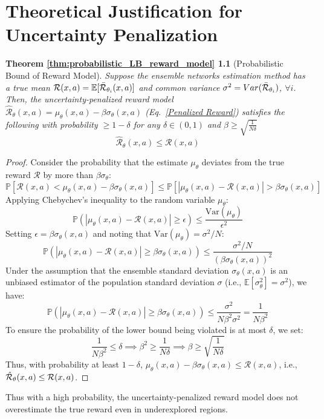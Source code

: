 \documentclass[./dissertation.tex]{subfiles}
\begin{document}
\chapter{Theoretical Justification for Uncertainty Penalization}
\label{sec:ensemble_theory}
\newtheorem*{repeatedThm}{Theorem \ref{thm:probabilistic_LB_reward_model}}
\begin{repeatedThm}[Probabilistic Bound of Reward Model]
Suppose the ensemble networks estimation method has a true mean ${\cal R}(x,a)=\mathbb{E}[\bar{\cal R}_{\theta_i}(x,a)]$ and common variance $\sigma^2=Var(\bar{\cal R}_{\theta_i})$, $\forall i$. Then, the uncertainty-penalized reward model $\hat{\mathcal{R}}_\theta(x, a) = \mu_\theta(x, a) - \beta \sigma_\theta(x, a)$ (Eq.~\ref{Penalized Reward}) satisfies the following with probability $\ge 1 - \delta$ for any $\delta \in (0, 1)$ and $\beta \geq \sqrt{\frac{1}{N\delta}}$
\[ \hat{\mathcal{R}}_\theta(x, a) \leq \mathcal{R}(x, a) \]
\end{repeatedThm}

\begin{proof}
Consider the probability that the estimate $\mu_\theta$ deviates from the true reward $\mathcal{R}$ by more than $\beta \sigma_\theta$:
\[ \mathbb{P}\left[ \mathcal{R}(x, a) < \mu_\theta(x, a) - \beta \sigma_\theta(x, a) \right] \leq \mathbb{P}\left[ |\mu_\theta(x, a) - \mathcal{R}(x, a)| > \beta \sigma_\theta(x, a) \right] \]
Applying Chebychev's inequality to the random variable $\mu_\theta$:
\[ \mathbb{P}\left( |\mu_\theta(x, a) - \mathcal{R}(x, a)| \geq \epsilon \right) \leq \frac{\text{Var}(\mu_\theta)}{\epsilon^2} \]
Setting $\epsilon = \beta \sigma_\theta(x, a)$ and noting that $\text{Var}(\mu_\theta)=\sigma^2/N$:
\[ \mathbb{P}\left( |\mu_\theta(x, a) - \mathcal{R}(x, a)| \geq \beta \sigma_\theta(x, a) \right) \leq \frac{\sigma^2 / N}{(\beta \sigma_\theta(x, a))^2} \]
Under the assumption that the ensemble standard deviation $\sigma_\theta(x, a)$ is an unbiased estimator of the population standard deviation $\sigma$ (i.e., $\mathbb{E}[\sigma_\theta^2] = \sigma^2$), we have:
\[ \mathbb{P}\left( |\mu_\theta(x, a) - \mathcal{R}(x, a)| \geq \beta \sigma_\theta(x, a) \right) \leq \frac{\sigma^2}{N \beta^2 \sigma^2} = \frac{1}{N \beta^2} \]
To ensure the probability of the lower bound being violated is at most $\delta$, we set:
\[ \frac{1}{N \beta^2} \leq \delta \implies \beta^2 \geq \frac{1}{N \delta} \implies \beta \geq \sqrt{\frac{1}{N \delta}} \]
Thus, with probability at least $1 - \delta$, $\mu_\theta(x, a) - \beta \sigma_\theta(x, a) \leq \mathcal{R}(x, a)$, i.e., $\hat{\cal R}_\theta(x,a) \leq \mathcal{R}(x, a)$.
\end{proof}
Thus with a high probability, the uncertainty-penalized reward model does not overestimate the true reward even in underexplored regions.
\end{document}

